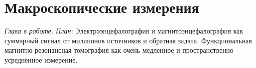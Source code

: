 \chapter{Макроскопические измерения}
\label{sec:imaging}

\emph{Глава в работе. План:} Электроэнцефалография и магнитоэнцефалография как суммарный сигнал от миллионов источников и обратная задача. Функциональная магнитно-резонансная томография как очень медленное и пространственно усреднённое измерение.
